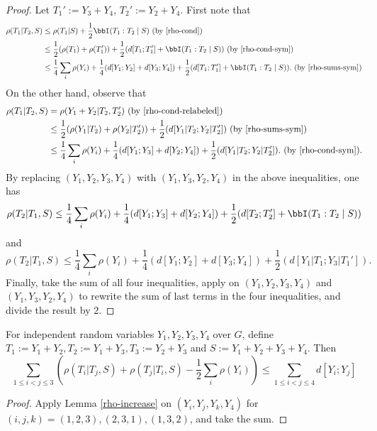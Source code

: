 \begin{proof}
  Let $T_1':=Y_3+Y_4$, $T_2':=Y_2+Y_4$.
  First note that
  \begin{align*}
    \rho(T_1|T_2,S)
    &\le \rho(T_1|S) + \frac{1}{2}\bbI(T_1:T_2\mid S)  \textrm{ (by \Cref{rho-cond})}\\
    &\le \frac{1}{2}(\rho(T_1)+\rho(T_1'))+\frac{1}{2}(d[T_1;T_1']+\bbI(T_1:T_2\mid S)) \textrm{ (by \Cref{rho-cond-sym})}\\
    &\le \frac{1}{4} \sum_{i} \rho(Y_i) +\frac{1}{4}(d[Y_1;Y_2]+d[Y_3;Y_4]) + \frac{1}{2}(d[T_1;T_1']+\bbI(T_1:T_2\mid S)). \textrm{ (by \Cref{rho-sums-sym})}
  \end{align*}
  On the other hand, observe that
  \begin{align*}
    \rho(T_1|T_2,S)
    &=\rho(Y_1+Y_2|T_2,T_2') \textrm{ (by \Cref{rho-cond-relabeled})}\\
    &\le \frac{1}{2}(\rho(Y_1|T_2)+\rho(Y_2|T_2'))+\frac{1}{2}(d[Y_1|T_2;Y_2|T_2'])  \textrm{ (by \Cref{rho-sums-sym})}\\
    &\le \frac{1}{4} \sum_{i} \rho(Y_i) +\frac{1}{4}(d[Y_1;Y_3]+d[Y_2;Y_4]) + \frac{1}{2}(d[Y_1|T_2;Y_2|T_2']). \textrm{ (by \Cref{rho-cond-sym})}.
  \end{align*}
  By replacing $(Y_1,Y_2,Y_3,Y_4)$ with $(Y_1,Y_3,Y_2,Y_4)$ in the above inequalities, one has
  $$\rho(T_2|T_1,S) \le \frac{1}{4} \sum_{i} \rho(Y_i) +\frac{1}{4}(d[Y_1;Y_3]+d[Y_2;Y_4]) + \frac{1}{2}(d[T_2;T_2']+\bbI(T_1:T_2\mid S))$$
  and
  $$\rho(T_2|T_1,S) \le \frac{1}{4} \sum_{i} \rho(Y_i) +\frac{1}{4}(d[Y_1;Y_2]+d[Y_3;Y_4]) + \frac{1}{2}(d[Y_1|T_1;Y_3|T_1']).$$
  Finally, take the sum of all four inequalities, apply  on $(Y_1,Y_2,Y_3,Y_4)$ and $(Y_1,Y_3,Y_2,Y_4)$ to rewrite the sum of last terms in the four inequalities, and divide the result by $2$.
\end{proof}

\begin{lemma}\label{rho-increase-symmetrized}\leanok
  For independent random variables $Y_1,Y_2,Y_3,Y_4$ over $G$, define $T_1:=Y_1+Y_2,T_2:=Y_1+Y_3,T_3:=Y_2+Y_3$ and $S:=Y_1+Y_2+Y_3+Y_4$. Then
  $$\sum_{1 \leq i<j \leq 3} (\rho(T_i|T_j,S) + \rho(T_j|T_i,S) -  \frac{1}{2}\sum_{i} \rho(Y_i))\le \sum_{1\leq i < j \leq 4}d[Y_i;Y_j]$$
\end{lemma}

\begin{proof}
  Apply Lemma \ref{rho-increase} on $(Y_i,Y_j,Y_k,Y_4)$ for $(i,j,k)=(1,2,3),(2,3,1),(1,3,2)$, and take the sum.
\end{proof}

